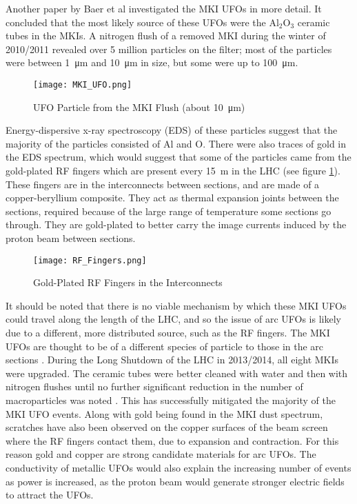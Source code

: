 \documentclass[../main.tex]{subfiles}
\begin{document}
Another paper by Baer et al \cite{baer_mki} investigated the MKI UFOs in more detail.
It concluded that the most likely source of these UFOs were the Al$_{2}$O$_{3}$ ceramic tubes in the MKIs.
A nitrogen flush of a removed MKI during the winter of 2010/2011 revealed over 5 million particles on the filter; most of the particles were between \SI{1}{\micro\metre} and \SI{10}{\micro\metre} in size, but some were up to \SI{100}{\micro\metre}.\\

\begin{figure}[ht]
	\centering
	\texttt{[image: MKI\_UFO.png]}
	\caption{UFO Particle from the MKI Flush (about \SI{10}{\micro\metre}) \cite{baer_mki}}
\end{figure}

Energy-dispersive x-ray spectroscopy (EDS) of these particles suggest that the majority of the particles consisted of Al and O.
There were also traces of gold in the EDS spectrum, which would suggest that some of the particles came from the gold-plated RF fingers which are present every \SI{15}{\metre} in the LHC (see figure \ref{fig:RF_Fingers}).
These fingers are in the interconnects between sections, and are made of a copper-beryllium composite.
They act as thermal expansion joints between the sections, required because of the large range of temperature some sections go through.
They are gold-plated to better carry the image currents induced by the proton beam between sections.\\

\begin{figure}[ht]
	\centering
	\texttt{[image: RF\_Fingers.png]}
	\caption{Gold-Plated RF Fingers in the Interconnects}
	\label{fig:RF_Fingers}
\end{figure}

It should be noted that there is no viable mechanism by which these MKI UFOs could travel along the length of the LHC, and so the issue of arc UFOs is likely due to a different, more distributed source, such as the RF fingers.
The MKI UFOs are thought to be of a different species of particle to those in the arc sections \cite{grob_ufo}.
During the Long Shutdown of the LHC in 2013/2014, all eight MKIs were upgraded.
The ceramic tubes were better cleaned with water and then with nitrogen flushes until no further significant reduction in the number of macroparticles was noted \cite{barnes_mki}.
This has successfully mitigated the majority of the MKI UFO events.
Along with gold being found in the MKI dust spectrum, scratches have also been observed on the copper surfaces of the beam screen where the RF fingers contact them, due to expansion and contraction.
For this reason gold and copper are strong candidate materials for arc UFOs.
The conductivity of metallic UFOs would also explain the increasing number of events as power is increased, as the proton beam would generate stronger electric fields to attract the UFOs.\\
\end{document}
